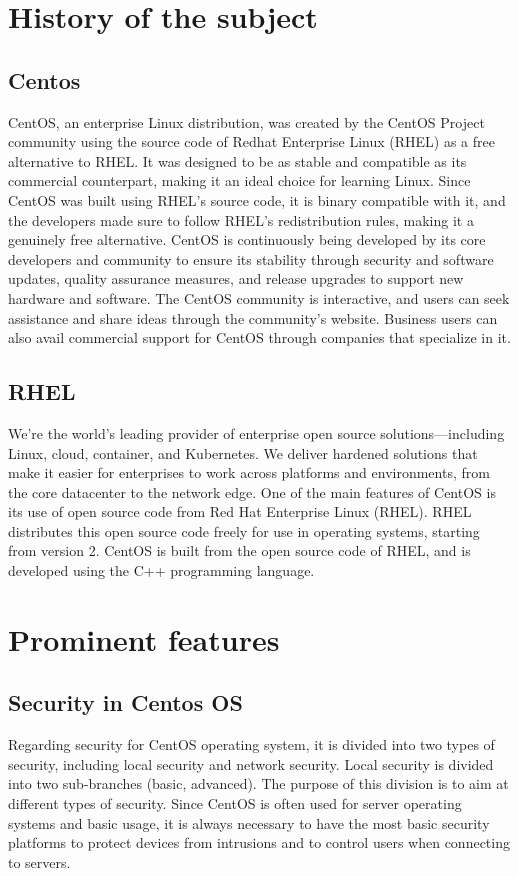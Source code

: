 \documentclass[10pt]{article}
\begin{document}
\section{History of the subject}
\subsection{Centos}


CentOS, an enterprise Linux distribution, was created by the CentOS Project community using the source code of Redhat Enterprise Linux (RHEL) as a free alternative to RHEL. It was designed to be as stable and compatible as its commercial counterpart, making it an ideal choice for learning Linux. Since CentOS was built using RHEL's source code, it is binary compatible with it, and the developers made sure to follow RHEL's redistribution rules, making it a genuinely free alternative. CentOS is continuously being developed by its core developers and community to ensure its stability through security and software updates, quality assurance measures, and release upgrades to support new hardware and software. The CentOS community is interactive, and users can seek assistance and share ideas through the community's website. Business users can also avail commercial support for CentOS through companies that specialize in it.
\cite{CentosAbout}

\subsection{RHEL}

We’re the world’s leading provider of enterprise open source solutions—including Linux, cloud, container, and Kubernetes. We deliver hardened solutions that make it easier for enterprises to work across platforms and environments, from the core datacenter to the network edge.
\cite{RHELAbout}
One of the main features of CentOS is its use of open source code from Red Hat Enterprise Linux (RHEL). RHEL distributes this open source code freely for use in operating systems, starting from version 2. CentOS is built from the open source code of RHEL, and is developed using the C++ programming language.

\section{Prominent features}

\subsection{Security in Centos OS}
Regarding security for CentOS operating system, it is divided into two types of security, including local security and network security. Local security is divided into two sub-branches (basic, advanced). The purpose of this division is to aim at different types of security. Since CentOS is often used for server operating systems and basic usage, it is always necessary to have the most basic security platforms to protect devices from intrusions and to control users when connecting to servers.
\end{document}
